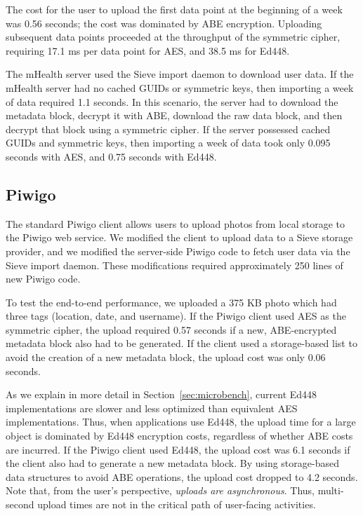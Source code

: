 The cost for the user to upload the first data point
at the beginning of a week was 0.56 seconds;
the cost was dominated by ABE encryption.
Uploading subsequent data points proceeded
at the throughput of the symmetric cipher,
requiring 17.1 ms per data point for AES,
and 38.5 ms for Ed448.

The mHealth server used the Sieve import daemon
to download user data. If the mHealth server
had no cached GUIDs or symmetric keys, then
importing a week of data required 1.1 seconds.
In this scenario, the server had to download
the metadata block, decrypt it with ABE,
download the raw data block, and then decrypt
that block using a symmetric cipher. If the
server possessed cached GUIDs and symmetric keys,
then importing a week of data took only 0.095
seconds with AES, and 0.75 seconds with Ed448.

\subsection{Piwigo} 
The standard Piwigo client
allows users to upload photos from local storage
to the Piwigo web service. We modified the client
to upload data to a Sieve storage provider, and
we modified the server-side Piwigo code to fetch
user data via the Sieve import daemon. These
modifications required approximately 250 lines
of new Piwigo code.

To test the end-to-end performance, we uploaded
a 375 KB photo which had three tags (location,
date, and username). If the Piwigo client used
AES as the symmetric cipher, the upload
required 0.57 seconds if a new, ABE-encrypted
metadata block also had to be generated. If the
client used a storage-based list to avoid the
creation of a new metadata block, the upload
cost was only 0.06 seconds.

As we explain in more detail in Section~\ref{sec:microbench},
current Ed448 implementations are slower and less
optimized than equivalent AES implementations.
Thus, when applications use Ed448, the upload time
for a large object is dominated by Ed448 encryption
costs, regardless of whether ABE costs are incurred.
If the Piwigo client used Ed448, the upload cost
was 6.1 seconds if the client also had to generate
a new metadata block. By using storage-based data
structures to avoid ABE operations, the upload
cost dropped to 4.2 seconds. Note that, from the
user's perspective, \emph{uploads are asynchronous}.
Thus, multi-second upload times are not in the
critical path of user-facing activities.


